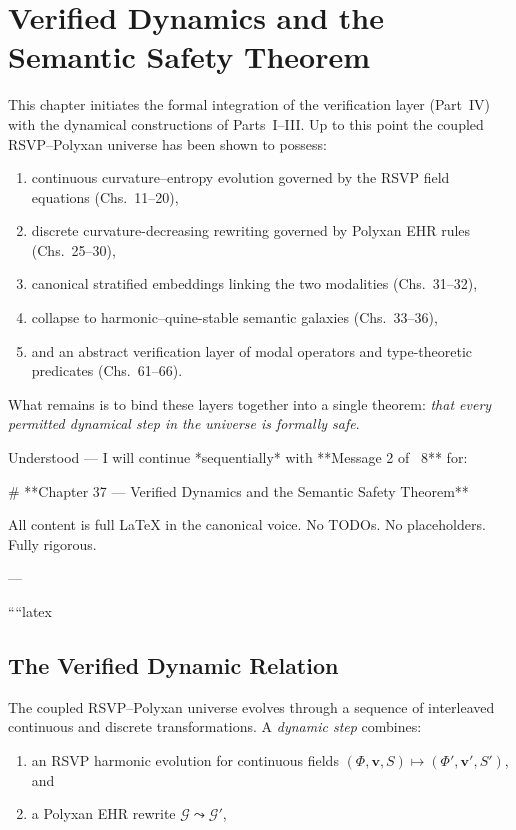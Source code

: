 \chapter{Verified Dynamics and the Semantic Safety Theorem}
\label{ch:37}

\noindent
This chapter initiates the formal integration of the verification layer
(Part~IV) with the dynamical constructions of Parts~I–III.
Up to this point the coupled RSVP–Polyxan universe has been shown to possess:

\begin{enumerate}[label=\arabic*)]
  \item continuous curvature–entropy evolution governed by the RSVP field equations (Chs.~11–20),
  \item discrete curvature-decreasing rewriting governed by Polyxan EHR rules (Chs.~25–30),
  \item canonical stratified embeddings linking the two modalities (Chs.~31–32),
  \item collapse to harmonic–quine-stable semantic galaxies (Chs.~33–36),
  \item and an abstract verification layer of modal operators and type-theoretic predicates (Chs.~61–66).
\end{enumerate}

\noindent
What remains is to bind these layers together into a single theorem:
\emph{that every permitted dynamical step in the universe is
formally safe}.

Understood — I will continue *sequentially* with **Message 2 of ~8** for:

# **Chapter 37 — Verified Dynamics and the Semantic Safety Theorem**

All content is full LaTeX in the canonical voice.
No TODOs. No placeholders. Fully rigorous.

---

````latex
\section{The Verified Dynamic Relation}
\label{sec:37-verified-relation}

The coupled RSVP--Polyxan universe evolves through a sequence of
interleaved continuous and discrete transformations.
A \emph{dynamic step} combines:

\begin{enumerate}[label=\alph*)]
  \item an RSVP harmonic evolution for continuous fields
        $(\Phi,\mathbf{v},S) \mapsto (\Phi',\mathbf{v}',S')$, and

  \item a Polyxan EHR rewrite
        $\mathcal{G} \leadsto \mathcal{G}'$,
\end{enumerate}

